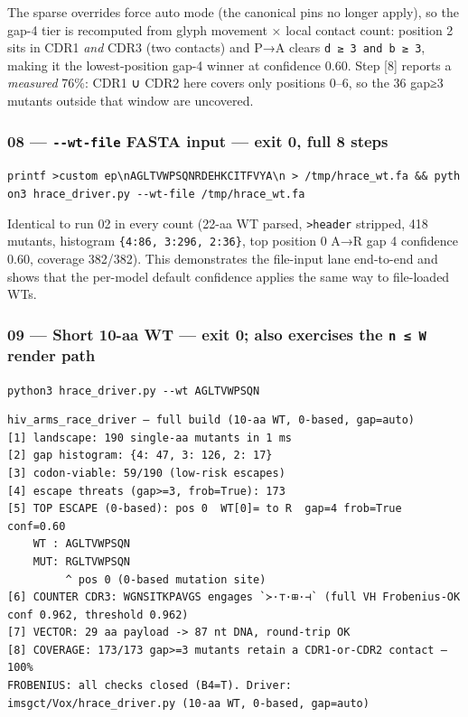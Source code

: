 The sparse overrides force auto mode (the canonical pins no longer
apply), so the gap-4 tier is recomputed from glyph movement × local
contact count: position 2 sits in CDR1 \emph{and} CDR3 (two contacts)
and P→A clears \texttt{d\ ≥\ 3\ and\ b\ ≥\ 3}, making it the
lowest-position gap-4 winner at confidence 0.60. Step {[}8{]} reports a
\emph{measured} 76\%: CDR1 ∪ CDR2 here covers only positions 0--6, so
the 36 gap≥3 mutants outside that window are uncovered.

\hypertarget{wt-file-fasta-input-exit-0-full-8-steps}{%
\subsubsection{\texorpdfstring{08 --- \texttt{-\/-wt-file} FASTA input
--- exit 0, full 8
steps}{08 --- -\/-wt-file FASTA input --- exit 0, full 8 steps}}\label{wt-file-fasta-input-exit-0-full-8-steps}}

\texttt{printf\ \textquotesingle{}\textgreater{}custom\ ep\textbackslash{}nAGLTVWPSQNRDEHKCITFVYA\textbackslash{}n\textquotesingle{}\ \textgreater{}\ /tmp/hrace\_wt.fa\ \&\&\ python3\ hrace\_driver.py\ -\/-wt-file\ /tmp/hrace\_wt.fa}

Identical to run 02 in every count (22-aa WT parsed,
\texttt{\textgreater{}header} stripped, 418 mutants, histogram
\texttt{\{4:86,\ 3:296,\ 2:36\}}, top position 0 A→R gap 4 confidence
0.60, coverage 382/382). This demonstrates the file-input lane
end-to-end and shows that the per-model default confidence applies the
same way to file-loaded WTs.

\hypertarget{short-10-aa-wt-exit-0-also-exercises-the-n-w-render-path}{%
\subsubsection{\texorpdfstring{09 --- Short 10-aa WT --- exit 0; also
exercises the \texttt{n\ ≤\ W} render
path}{09 --- Short 10-aa WT --- exit 0; also exercises the n ≤ W render path}}\label{short-10-aa-wt-exit-0-also-exercises-the-n-w-render-path}}

\texttt{python3\ hrace\_driver.py\ -\/-wt\ AGLTVWPSQN}

\begin{verbatim}
hiv_arms_race_driver — full build (10-aa WT, 0-based, gap=auto)
[1] landscape: 190 single-aa mutants in 1 ms
[2] gap histogram: {4: 47, 3: 126, 2: 17}
[3] codon-viable: 59/190 (low-risk escapes)
[4] escape threats (gap>=3, frob=True): 173
[5] TOP ESCAPE (0-based): pos 0  WT[0]= to R  gap=4 frob=True conf=0.60
    WT : AGLTVWPSQN
    MUT: RGLTVWPSQN
         ^ pos 0 (0-based mutation site)
[6] COUNTER CDR3: WGNSITKPAVGS engages `≻·⊤·⊞·⊣` (full VH Frobenius-OK conf 0.962, threshold 0.962)
[7] VECTOR: 29 aa payload -> 87 nt DNA, round-trip OK
[8] COVERAGE: 173/173 gap>=3 mutants retain a CDR1-or-CDR2 contact — 100%
FROBENIUS: all checks closed (B4=T). Driver: imsgct/Vox/hrace_driver.py (10-aa WT, 0-based, gap=auto)
\end{verbatim}

